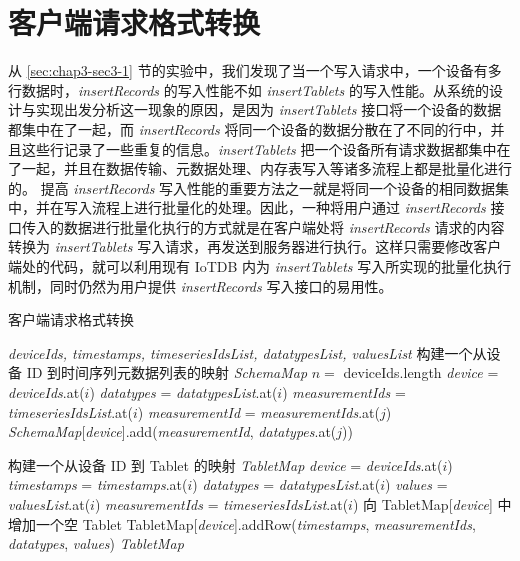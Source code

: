 \section{客户端请求格式转换}
从 \ref{sec:chap3-sec3-1} 节的实验中，我们发现了当一个写入请求中，一个设备有多行数据时，\emph{insertRecords} 的写入性能不如 \emph{insertTablets} 的写入性能。从系统的设计与实现出发分析这一现象的原因，是因为 \emph{insertTablets} 接口将一个设备的数据都集中在了一起，而 \emph{insertRecords} 将同一个设备的数据分散在了不同的行中，并且这些行记录了一些重复的信息。\emph{insertTablets} 把一个设备所有请求数据都集中在了一起，并且在数据传输、元数据处理、内存表写入等诸多流程上都是批量化进行的。
提高 \emph{insertRecords} 写入性能的重要方法之一就是将同一个设备的相同数据集中，并在写入流程上进行批量化的处理。因此，一种将用户通过 \emph{insertRecords} 接口传入的数据进行批量化执行的方式就是在客户端处将 \emph{insertRecords} 请求的内容转换为 \emph{insertTablets} 写入请求，再发送到服务器进行执行。这样只需要修改客户端处的代码，就可以利用现有 IoTDB 内为 \emph{insertTablets} 写入所实现的批量化执行机制，同时仍然为用户提供 \emph{insertRecords} 写入接口的易用性。

\begin{algorithm}
  \caption{客户端请求格式转换}
  \label{alg:client-req-convert}
  \small
  \begin{algorithmic}
    \REQUIRE \emph{deviceIds, timestamps, timeseriesIdsList, datatypesList, valuesList}
    \STATE 构建一个从设备 ID 到时间序列元数据列表的映射 \emph{SchemaMap}
    \STATE $n = $ deviceIds.length
      \STATE \emph{device} =  \emph{deviceIds}.at($i$)
      \STATE \emph{datatypes} = \emph{datatypesList}.at($i$)
      \STATE \emph{measurementIds} = \emph{timeseriesIdsList}.at($i$)
        \STATE \emph{measurementId} = \emph{measurementIds}.at($j$)
          \STATE \emph{SchemaMap}[\emph{device}].add(\emph{measurementId}, \emph{datatypes}.at($j$))
        \ENDIF
      \ENDFOR
    \ENDFOR

    \STATE 构建一个从设备 ID 到 Tablet 的映射 \emph{TabletMap}
      \STATE \emph{device} =  \emph{deviceIds}.at($i$)
      \STATE \emph{timestamps} = \emph{timestamps}.at($i$)
      \STATE \emph{datatypes} = \emph{datatypesList}.at($i$)
      \STATE \emph{values} = \emph{valuesList}.at($i$)
      \STATE \emph{measurementIds} = \emph{timeseriesIdsList}.at($i$)
        \STATE 向 TabletMap[\emph{device}] 中增加一个空 Tablet
      \ENDIF 
      \STATE TabletMap[\emph{device}].addRow(\emph{timestamps}, \emph{measurementIds}, \emph{datatypes}, \emph{values})
    \ENDFOR
    \RETURN \emph{TabletMap}
  \end{algorithmic}
\end{algorithm}

